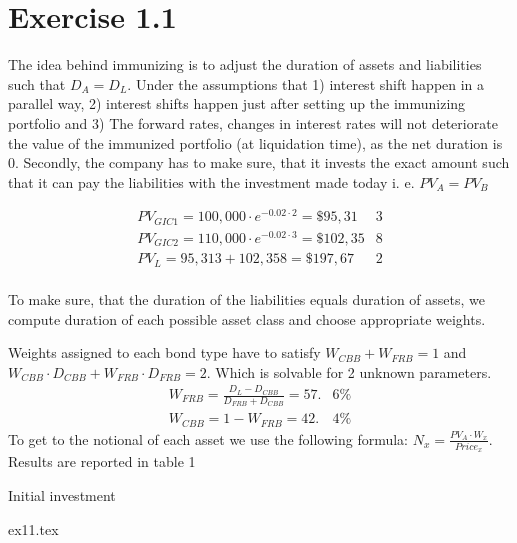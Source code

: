 
\section*{Exercise 1.1}

The idea behind immunizing is to adjust the duration of assets and liabilities such that $D_{A}=D_{L}$. Under the assumptions that 1) interest shift happen in a parallel way, 2) interest shifts happen just after setting up the immunizing portfolio and 3) The forward rates, changes in interest rates will not deteriorate the value of the immunized portfolio (at liquidation time), as the net duration is 0. Secondly, the company has to make sure, that it invests the exact amount such that it can pay the liabilities with the investment made today i. e. $PV_A = PV_B$

\begin{align*}
PV_{GIC1} = 100,000\cdot e^{-0.02\cdot 2} = \$ 95,31&3 \\
PV_{GIC2} = 110,000\cdot e^{-0.02\cdot 3} = \$ 102,35&8 \\
PV_{L} = 95,313 + 102,358 = \$ 197,67&2 \\
\end{align*}

To make sure, that the duration of the liabilities equals duration of assets, we compute duration of each possible asset class and choose appropriate weights.

\iffalse 
\begin{align*}
D_{L} = 2\cdot\frac{PV_{GIC1}{PV_{GIC2}+PV_{GIC2}} + 3\cdot\frac{PV_{GIC2}{PV_{GIC2}+PV_{GIC2}} = 2.5&2 \\
D_{CBB} = \sum_{i=1}^{5}(i\cdot\frac{CF_{i}*e^{-0.02*i}}{sum_DCF})+5\cdot \frac{1}{e^{0.02*5}} = 4.5&8 \\
D_{FRB} = 1.0&0 \\
\end{align*}
\fi

Weights assigned to each bond type have to satisfy $W_{CBB} + W_{FRB} = 1$ and $W_{CBB}\cdot D_{CBB} + W_{FRB}\cdot D_{FRB} = 2$. Which is solvable for 2 unknown parameters.
\begin{align*}
W_{FRB} = \frac{D_{L}-D_{CBB}}{D_{FRB}+D_{CBB}} = 57.&6 \% \\
W_{CBB} = 1 - W_{FRB} = 42.&4 \%
\end{align*}
To get to the notional of each asset we use the following formula: $N_{x} = \frac{PV_{A}\cdot W_{x}}{Price_{x}} $. Results are reported in table 1

\begin{table}[ht]
\centering
\caption{Initial investment}
\label{tab:initial_investment}
{ex11.tex}
\end{table}

